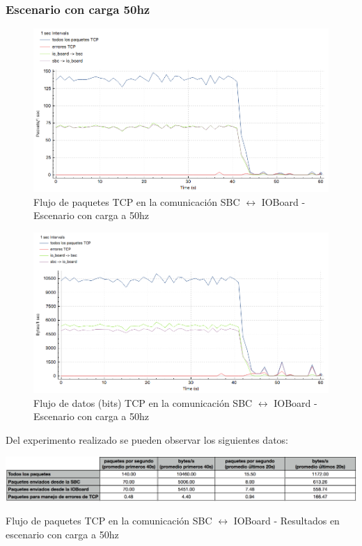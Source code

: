 \documentclass[withindex,glossary]{cam-thesis}
\begin{document}
\subsubsection{Escenario con carga 50hz}
\begin{figure}[H]
  \centering
  	\includegraphics[width=\textwidth]{images/TCP_Throughput_io_to_pc_50hz_pps}
  	\caption[Throughput de la conexión TCP - Básico]{Flujo de paquetes TCP en la comunicación SBC $\leftrightarrow$ IOBoard -  Escenario con carga a 50hz}
  \label{fig:TCP_Throughput_io_to_pc_50hz_pps}
\end{figure}

\begin{figure}[H]
  \centering
  	\includegraphics[width=\textwidth]{images/TCP_Throughput_io_to_pc_50hz_bps}
  	\caption[Throughput de la conexión TCP - Básico]{Flujo de datos (bits) TCP en la comunicación SBC $\leftrightarrow$ IOBoard -  Escenario con carga a 50hz}
  \label{fig:TCP_Throughput_io_to_pc_50hz_bps}
\end{figure}
Del experimento realizado se pueden observar los siguientes datos:
\begin{table}[H]
	\centering
 	\begin{minipage}[b]{\textwidth}  	
  		\includegraphics[width=\textwidth]{images/TCP_Throughput_io_to_pc_50hz_results}
  		\caption[Throughput de la conexión TCP - Básico]{Flujo de paquetes TCP en la comunicación SBC $\leftrightarrow$ IOBoard -  Resultados en escenario con carga a 50hz}
		\label{fig:TCP_Throughput_io_to_pc_50hz_results}
	\end{minipage}
\end{table}
\end{document}
